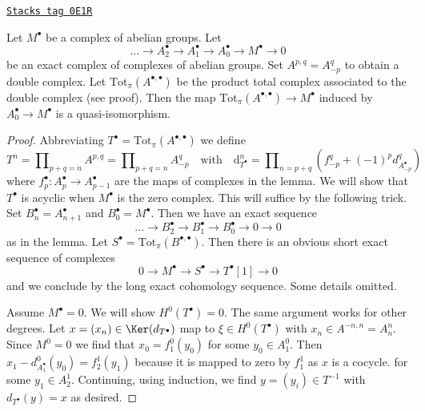 \begin{lemma}
\label{homology-lemma-resolution-gives-qis}
\href{https://stacks.math.columbia.edu/tag/0E1R}{\texttt{Stacks tag 0E1R}}

Let $M^\bullet$ be a complex of abelian groups. Let
$$
\ldots \to A_2^\bullet \to A_1^\bullet \to A_0^\bullet \to M^\bullet \to 0
$$
be an exact complex of complexes of abelian groups. Set $A^{p, q} = A_{-p}^q$
to obtain a double complex. Let $\text{Tot}_\pi(A^{\bullet, \bullet})$
be the product total complex associated to the double complex (see proof).
Then the map $\text{Tot}_\pi(A^{\bullet, \bullet}) \to M^\bullet$
induced by $A_0^\bullet \to M^\bullet$ is a quasi-isomorphism.
\end{lemma}

\begin{proof}
Abbreviating $T^\bullet = \text{Tot}_\pi(A^{\bullet, \bullet})$
we define
$$
T^n = \prod\nolimits_{p + q = n} A^{p, q} =
\prod\nolimits_{p + q = n} A_{-p}^q
\quad\text{with}\quad
\text{d}_{T^\bullet}^n =
\prod\nolimits_{n = p + q} (f_{-p}^q + (-1)^pd_{A_{-p}^\bullet}^q)
$$
where $f_p^\bullet : A_p^\bullet \to A_{p - 1}^\bullet$
are the maps of complexes in the lemma.
We will show that $T^\bullet$ is acyclic when
$M^\bullet$ is the zero complex. This will suffice by
the following trick. Set $B_n^\bullet = A_{n + 1}^\bullet$
and $B_0^\bullet = M^\bullet$. Then we have an exact sequence
$$
\ldots \to B_2^\bullet \to B_1^\bullet \to B_0^\bullet \to 0 \to 0
$$
as in the lemma. Let $S^\bullet = \text{Tot}_\pi(B^{\bullet, \bullet})$.
Then there is an obvious short exact sequence of complexes
$$
0 \to M^\bullet \to S^\bullet \to T^\bullet[1] \to 0
$$
and we conclude by the long exact cohomology sequence. Some details omitted.

\medskip\noindent
Assume $M^\bullet = 0$. We will show $H^0(T^\bullet) = 0$. The same argument
works for other degrees. Let $x =(x_n) \in \Ker(d_{T^\bullet})$
map to $\xi \in H^0(T^\bullet)$ with $x_n \in A^{-n, n} = A_n^n$.
Since $M^0 = 0$ we find that $x_0 = f_1^0(y_0)$ for some $y_0 \in A_1^0$.
Then $x_1 - d^0_{A_1^\bullet}(y_0) = f_2^1(y_1)$
because it is mapped to zero by $f_1^1$ as $x$ is a cocycle.
for some $y_1 \in A_2^1$. Continuing, using induction, we find
$y = (y_i) \in T^{-1}$ with $d_{T^\bullet}(y) = x$ as desired.
\end{proof}

